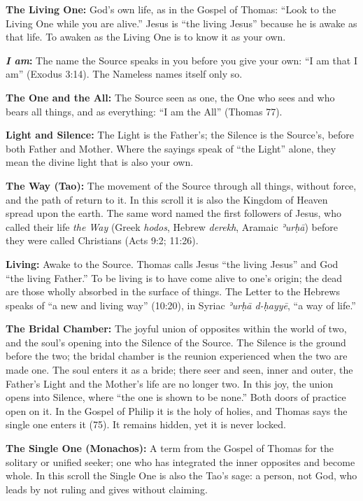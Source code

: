\documentclass[10pt, openright]{book}
\begin{document}
\textbf{The Living One:} God's own life, as in the Gospel of Thomas:
``Look to the Living One while you are alive.'' Jesus is ``the living
Jesus'' because he is awake as that life. To awaken as the Living One is
to know it as your own.

\textbf{\emph{I am}:} The name the Source speaks in you before you give
your own: ``I am that I am'' (Exodus 3:14). The Nameless names itself
only so.

\textbf{The One and the All:} The Source seen as one, the One who sees
and who bears all things, and as everything: ``I am the All'' (Thomas
77).

\textbf{Light and Silence:} The Light is the Father's; the Silence is
the Source's, before both Father and Mother. Where the sayings speak of
``the Light'' alone, they mean the divine light that is also your own.

\textbf{The Way (Tao):} The movement of the Source through all things,
without force, and the path of return to it. In this scroll it is also
the Kingdom of Heaven spread upon the earth. The same word named the
first followers of Jesus, who called their life \emph{the Way} (Greek
\emph{hodos}, Hebrew \emph{derekh}, Aramaic \emph{ʾurḥā}) before they
were called Christians (Acts 9:2; 11:26).

\textbf{Living:} Awake to the Source. Thomas calls Jesus ``the living
Jesus'' and God ``the living Father.'' To be living is to have come
alive to one's origin; the dead are those wholly absorbed in the surface
of things. The Letter to the Hebrews speaks of ``a new and living way''
(10:20), in Syriac \emph{ʾurḥā d-ḥayyē}, ``a way of life.''

\textbf{The Bridal Chamber:} The joyful union of opposites within the
world of two, and the soul's opening into the Silence of the Source. The
Silence is the ground before the two; the bridal chamber is the reunion
experienced when the two are made one. The soul enters it as a bride;
there seer and seen, inner and outer, the Father's Light and the
Mother's life are no longer two. In this joy, the union opens into
Silence, where ``the one is shown to be none.'' Both doors of practice
open on it. In the Gospel of Philip it is the holy of holies, and Thomas
says the single one enters it (75). It remains hidden, yet it is never
locked.

\textbf{The Single One (Monachos):} A term from the Gospel of Thomas for
the solitary or unified seeker; one who has integrated the inner
opposites and become whole. In this scroll the Single One is also the
Tao's sage: a person, not God, who leads by not ruling and gives without
claiming.
\end{document}

